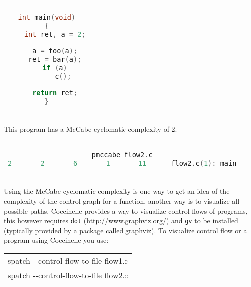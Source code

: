 \begin{center}
\begin{tabular}{c}
\begin{lstlisting}[language=C]
int main(void)
{
	int ret, a = 2;

	a = foo(a);
	ret = bar(a);
	if (a)
		c();

	return ret;
}
\end{lstlisting}\\
\end{tabular}
\end{center}

This program has a McCabe cyclomatic complexity of 2.

\begin{center}
\begin{tabular}{c}
\begin{lstlisting}[language=C]
pmccabe flow2.c
2       2       6       1       11      flow2.c(1): main
\end{lstlisting}\\
\end{tabular}
\end{center}

Using the McCabe cyclomatic complexity is one way to get an idea of
the complexity of the control graph for a function, another way is
to visualize all possible paths. Coccinelle provides a way to visualize
control flows of programs, this however requires {\tt dot}
(http://www.graphviz.org/) and {\tt gv} to be installed (typically provided
by a package called graphviz). To visualize control flow or a program
using Coccinelle you use:

\begin{center}
\begin{tabular}{c}
spatch -{}-control-flow-to-file flow1.c \\
spatch -{}-control-flow-to-file flow2.c
\end{tabular}
\end{center}




